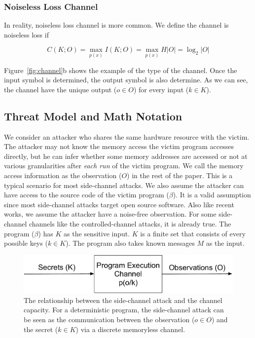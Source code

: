 \subsubsection{Noiseless Loss Channel}
In reality, noiseless loss channel is more common. We define the channel is noiseless loss if

\begin{equation} \label{eq:2}
  C(K;O) = \max_{p(x)} I(K;O) = \max_{p(x)} H |O| = \log_2 {|O|}
\end{equation}

Figure~\ref{fig:channel}b  shows the example of the type of the channel. Once the input symbol is determined, the output symbol is also determine. As we can see, the channel have the unique output ($o \in O$) for every input ($k \in K$).



\subsection{Threat Model and Math Notation}


We consider an attacker who shares the same hardware resource with the victim. The attacker may not know the memory access the victim program accesses directly, but he can infer whether some memory addresses are accessed or not at various granularities after \textit{each run} of the victim program. We call the memory access information as the observation ($O$) in the rest of the paper. This is a typical scenario for most side-channel attacks.  We also assume the attacker can have access to the source code of the victim program ($\beta$). It is a valid assumption since most side-channel attacks target open source software. Also like recent works, we assume the attacker have a noise-free observation. For some side-channel channels like the controlled-channel attacks, it is already true. The program ($\beta$) has $K$ as the sensitive input. $K$ is a finite set that consists of every possible keys ($k \in K$). The program also takes known messages $M$ as the input.

\begin{figure}[ht]
  \centering
  \includegraphics[width=\columnwidth]{./figures/chapter5/channel.pdf}
  \caption{The relationship between the side-channel attack and the channel capacity. For a deterministic program, the side-channel attack can be seen as the communication between the observation ($o \in O$) and the secret ($k \in K$) via a discrete memoryless channel.}
  \label{fig:side_channel}
\end{figure}

